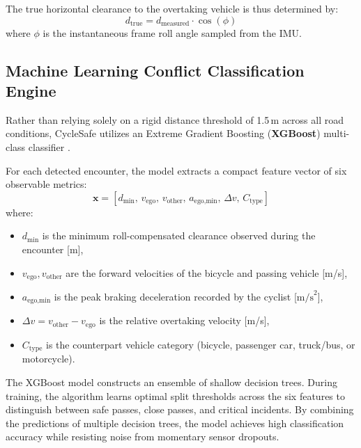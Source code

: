 The true horizontal clearance to the overtaking vehicle is thus determined by:
\begin{equation}
    d_{\text{true}} = d_{\text{measured}} \cdot \cos(\phi)
\end{equation}
where $\phi$ is the instantaneous frame roll angle sampled from the IMU.

\subsection{Machine Learning Conflict Classification Engine}
\label{sec:xgboost_formulation}
Rather than relying solely on a rigid distance threshold of 1.5\,m across all road conditions, CycleSafe utilizes an Extreme Gradient Boosting (\textbf{XGBoost}) multi-class classifier \cite{chen2016xgboost}. 

For each detected encounter, the model extracts a compact feature vector of six observable metrics:
\begin{equation}
    \mathbf{x} = \left[ d_{\text{min}},\, v_{\text{ego}},\, v_{\text{other}},\, a_{\text{ego,min}},\, \Delta v,\, C_{\text{type}} \right]
\end{equation}
where:
\begin{itemize}
    \item $d_{\text{min}}$ is the minimum roll-compensated clearance observed during the encounter [m],
    \item $v_{\text{ego}}, v_{\text{other}}$ are the forward velocities of the bicycle and passing vehicle [m/s],
    \item $a_{\text{ego,min}}$ is the peak braking deceleration recorded by the cyclist [$\text{m/s}^2$],
    \item $\Delta v = v_{\text{other}} - v_{\text{ego}}$ is the relative overtaking velocity [m/s],
    \item $C_{\text{type}}$ is the counterpart vehicle category (bicycle, passenger car, truck/bus, or motorcycle).
\end{itemize}

The XGBoost model constructs an ensemble of shallow decision trees. During training, the algorithm learns optimal split thresholds across the six features to distinguish between safe passes, close passes, and critical incidents. By combining the predictions of multiple decision trees, the model achieves high classification accuracy while resisting noise from momentary sensor dropouts.

